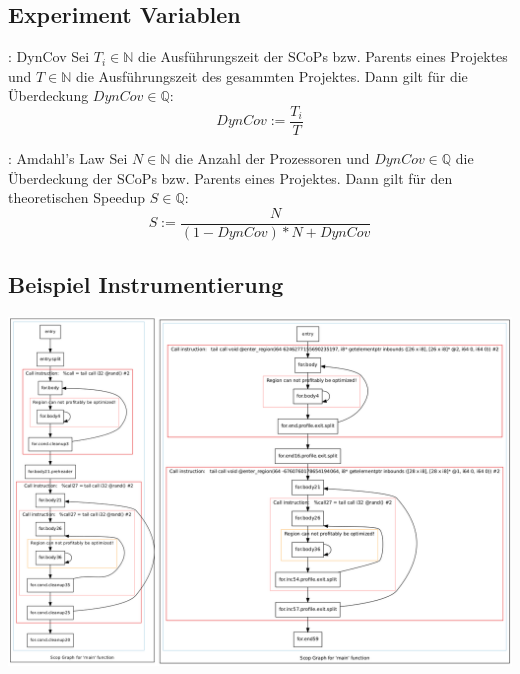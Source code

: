 \documentclass[aspectratio=169, xcolor=dvipsnames]{beamer}
\begin{document}
\subsection{Experiment Variablen}
\begin{frame}{\subsecname: DynCov}
    Sei \(T_i\in\mathbb{N}\) die Ausführungszeit der SCoPs bzw. Parents eines Projektes und \(T\in\mathbb{N}\) die Ausführungszeit des gesammten Projektes. Dann gilt für die Überdeckung \(DynCov\in\mathbb{Q}\):
    \Huge{\[DynCov := \frac{T_i}{T}\]}
\end{frame}
\begin{frame}{\subsecname: Amdahl's Law}
    Sei \(N\in\mathbb{N}\) die Anzahl der Prozessoren und \(DynCov\in\mathbb{Q}\) die Überdeckung der SCoPs bzw. Parents eines Projektes. Dann gilt für den theoretischen Speedup \(S\in\mathbb{Q}\):
    \Huge{\[S := \frac{N}{(1-DynCov)*N+DynCov}\]}
\end{frame}
\subsection{Beispiel Instrumentierung}
\begin{frame}{\subsecname}
    \centering
    \includegraphics[height=\textheight]{gfx/matmulScopsAfterInstrumentation.png}
\end{frame}
\end{document}
